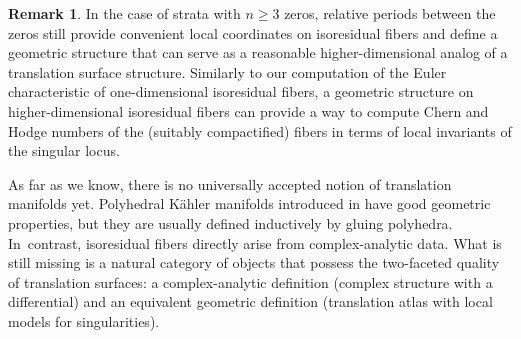 \documentclass[JEP,XML,SOM,Unicode,NoFloatCountersInSection,published]{cedram}
\theoremstyle{definition}
\newtheorem{rmk}[thm]{Remark}
\begin{document}
\begin{rmk}
In the case of strata with $n \geq 3$ zeros, relative periods between the zeros still provide convenient local coordinates on isoresidual fibers and define a geometric structure that can serve as a reasonable higher-dimensional analog of a translation surface structure. Similarly to our computation of the Euler characteristic of one-dimensional isoresidual fibers, a geometric structure on higher-dimensional isoresidual fibers can provide a way to compute Chern and Hodge numbers of the (suitably compactified) fibers in terms of local invariants of the singular locus.

As far as we know, there is no universally accepted notion of translation manifolds yet. Polyhedral Kähler manifolds introduced in \cite{Pan} have good geometric properties, but they are usually defined inductively by gluing polyhedra. In~contrast, isoresidual fibers directly arise from complex-analytic data. What is still missing is a natural category of objects that possess the two-faceted quality of translation surfaces: a complex-analytic definition (complex structure with a differential) and an equivalent geometric definition (translation atlas with local models for singularities).
\end{rmk}

\end{document}
